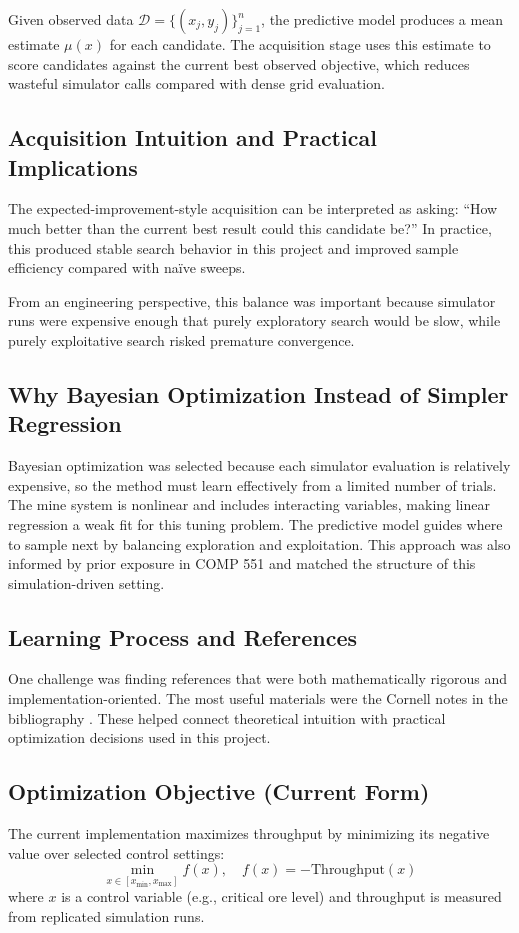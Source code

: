 \documentclass[11pt]{article}
\begin{document}
Given observed data $\mathcal{D} = \{(x_j, y_j)\}_{j=1}^{n}$, the predictive model produces a mean estimate $\mu(x)$ for each candidate. The acquisition stage uses this estimate to score candidates against the current best observed objective, which reduces wasteful simulator calls compared with dense grid evaluation.

\subsection{Acquisition Intuition and Practical Implications}
The expected-improvement-style acquisition can be interpreted as asking: ``How much better than the current best result could this candidate be?'' In practice, this produced stable search behavior in this project and improved sample efficiency compared with naïve sweeps.

From an engineering perspective, this balance was important because simulator runs were expensive enough that purely exploratory search would be slow, while purely exploitative search risked premature convergence.

\subsection{Why Bayesian Optimization Instead of Simpler Regression}
Bayesian optimization was selected because each simulator evaluation is relatively expensive, so the method must learn effectively from a limited number of trials. The mine system is nonlinear and includes interacting variables, making linear regression a weak fit for this tuning problem. The predictive model guides where to sample next by balancing exploration and exploitation. This approach was also informed by prior exposure in COMP 551 and matched the structure of this simulation-driven setting.

\subsection{Learning Process and References}
One challenge was finding references that were both mathematically rigorous and implementation-oriented. The most useful materials were the Cornell notes in the bibliography \cite{cornell4780note15,cornell4787lec16,cornell4787lec17}. These helped connect theoretical intuition with practical optimization decisions used in this project.

\subsection{Optimization Objective (Current Form)}
The current implementation maximizes throughput by minimizing its negative value over selected control settings:
\[
\min_{x \in [x_{\min}, x_{\max}]} f(x), \quad f(x) = -\text{Throughput}(x)
\]
where $x$ is a control variable (e.g., critical ore level) and throughput is measured from replicated simulation runs.
\end{document}
